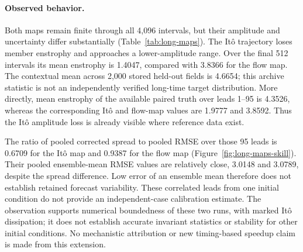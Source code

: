 

\paragraph{Observed behavior.}
Both maps remain finite through all 4,096 intervals, but their amplitude and uncertainty differ substantially (Table~\ref{tab:long-maps}). The It\^o trajectory loses member enstrophy and approaches a lower-amplitude range. Over the final 512 intervals its mean enstrophy is 1.4047, compared with 3.8366 for the flow map. The contextual mean across 2,000 stored held-out fields is 4.6654; this archive statistic is not an independently verified long-time target distribution. More directly, mean enstrophy of the available paired truth over leads 1--95 is 4.3526, whereas the corresponding It\^o and flow-map values are 1.9777 and 3.8592. Thus the It\^o amplitude loss is already visible where reference data exist.

The ratio of pooled corrected spread to pooled RMSE over those 95 leads is 0.6709 for the It\^o map and 0.9387 for the flow map (Figure~\ref{fig:long-maps-skill}). Their pooled ensemble-mean RMSE values are relatively close, 3.0148 and 3.0789, despite the spread difference. Low error of an ensemble mean therefore does not establish retained forecast variability. These correlated leads from one initial condition do not provide an independent-case calibration estimate. The observation supports numerical boundedness of these two runs, with marked It\^o dissipation; it does not establish accurate invariant statistics or stability for other initial conditions. \longTeacherComparison No mechanistic attribution or new timing-based speedup claim is made from this extension.

